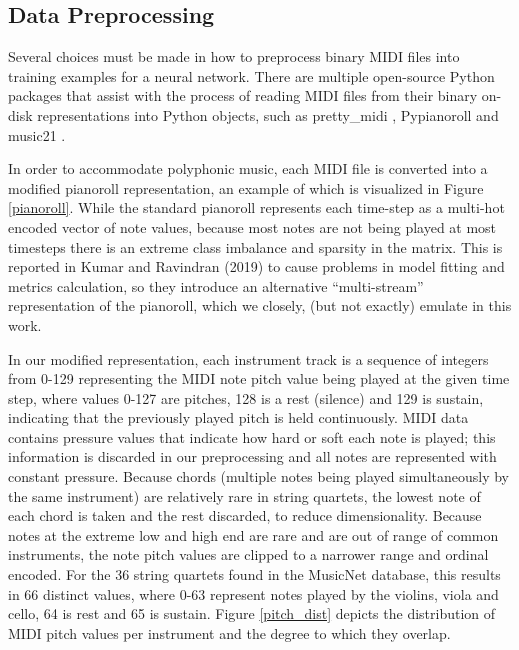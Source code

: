 \documentclass[sigconf,authorversion]{acmart}
\begin{document}
\subsection{Data Preprocessing}

Several choices must be made in how to preprocess binary MIDI files
into training examples for a neural network. There are multiple
open-source Python packages that assist with the process of reading
MIDI files from their binary on-disk representations into Python
objects, such as pretty\_midi \cite{raffel_pretty_midi_2014},
Pypianoroll \cite{dong_pypianoroll_2018} and music21
\cite{cuthbert_music21_2010}.

In order to accommodate polyphonic music, each MIDI file is converted
into a modified pianoroll representation, an example of which is
visualized in Figure \ref{pianoroll}. While the standard pianoroll
represents each time-step as a multi-hot encoded vector of note
values, because most notes are not being played at most timesteps
there is an extreme class imbalance and sparsity in the matrix. This
is reported in Kumar and Ravindran (2019) \cite{kumar2019polyphonic}
to cause problems in model fitting and metrics calculation, so they
introduce an alternative ``multi-stream'' representation of the
pianoroll, which we closely, (but not exactly) emulate in this work.

In our modified representation, each instrument track is a sequence of
integers from 0-129 representing the MIDI note pitch value being
played at the given time step, where values 0-127 are pitches, 128 is
a rest (silence) and 129 is sustain, indicating that the previously
played pitch is held continuously. MIDI data contains pressure values
that indicate how hard or soft each note is played; this information
is discarded in our preprocessing and all notes are represented with
constant pressure. Because chords (multiple notes being played
simultaneously by the same instrument) are relatively rare in string
quartets, the lowest note of each chord is taken and the rest
discarded, to reduce dimensionality. Because notes at the extreme low
and high end are rare and are out of range of common instruments, the
note pitch values are clipped to a narrower range and ordinal
encoded. For the 36 string quartets found in the MusicNet database,
this results in 66 distinct values, where 0-63 represent notes played
by the violins, viola and cello, 64 is rest and 65 is sustain. Figure
\ref{pitch_dist} depicts the distribution of MIDI pitch values per
instrument and the degree to which they overlap.
\end{document}
